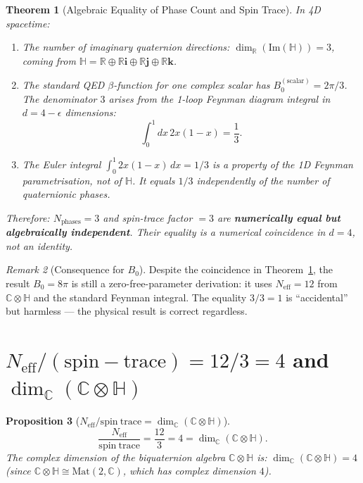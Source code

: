 \documentclass[12pt,a4paper]{article}
\newtheorem{theorem}{Theorem}[section]
\newtheorem{proposition}[theorem]{Proposition}
\theoremstyle{definition}
\theoremstyle{remark}
\newtheorem{remark}[theorem]{Remark}
\begin{document}
\begin{theorem}[Algebraic Equality of Phase Count and Spin Trace]
\label{thm:equality}
In 4D spacetime:
\begin{enumerate}
  \item[(i)] The number of imaginary quaternion directions:
    $\dim_{\mathbb{R}}(\mathrm{Im}(\mathbb{H})) = 3$,
    coming from $\mathbb{H} = \mathbb{R}\oplus\mathbb{R}\mathbf{i}\oplus\mathbb{R}\mathbf{j}
    \oplus\mathbb{R}\mathbf{k}$.

  \item[(ii)] The standard QED $\beta$-function for one complex scalar
    has $B_0^{(\mathrm{scalar})} = 2\pi/3$.  The denominator $3$ arises from
    the 1-loop Feynman diagram integral in $d=4-\epsilon$ dimensions:
    \[
      \int_0^1 dx\, 2x(1-x) = \frac{1}{3}.
    \]

  \item[(iii)] The Euler integral $\int_0^1 2x(1-x)\,dx = 1/3$ is a property
    of the 1D Feynman parametrisation, \emph{not} of $\mathbb{H}$.
    It equals $1/3$ independently of the number of quaternionic phases.
\end{enumerate}
Therefore: $N_{\mathrm{phases}} = 3$ and spin-trace factor $= 3$ are
\textbf{numerically equal but algebraically independent}.
Their equality is a \emph{numerical coincidence in $d=4$}, not an identity.
\end{theorem}

\begin{remark}[Consequence for $B_0$]
Despite the coincidence in Theorem~\ref{thm:equality},
the result $B_0 = 8\pi$ is still a zero-free-parameter derivation:
it uses $N_{\mathrm{eff}} = 12$ from $\mathbb{C}\otimes\mathbb{H}$
and the standard Feynman integral.  The equality $3/3 = 1$ is
``accidental'' but harmless --- the physical result is correct regardless.
\end{remark}

\section{$N_{\mathrm{eff}}/(\mathrm{spin-trace}) = 12/3 = 4$ and
         $\dim_{\mathbb{C}}(\mathbb{C}\otimes\mathbb{H})$}
\label{sec:neff_over_spin}

\begin{proposition}[$N_{\mathrm{eff}} / \mathrm{spin\ trace} = \dim_{\mathbb{C}}(\mathbb{C}\otimes\mathbb{H})$]
\label{prop:neff_dim}
\begin{equation}
  \frac{N_{\mathrm{eff}}}{\mathrm{spin\ trace}} = \frac{12}{3} = 4
  = \dim_{\mathbb{C}}(\mathbb{C}\otimes\mathbb{H}).
\label{eq:ratio}
\end{equation}
The complex dimension of the biquaternion algebra $\mathbb{C}\otimes\mathbb{H}$ is:
$\dim_{\mathbb{C}}(\mathbb{C}\otimes\mathbb{H}) = 4$
(since $\mathbb{C}\otimes\mathbb{H} \cong \mathrm{Mat}(2,\mathbb{C})$, which has
complex dimension $4$).
\end{proposition}
\end{document}

